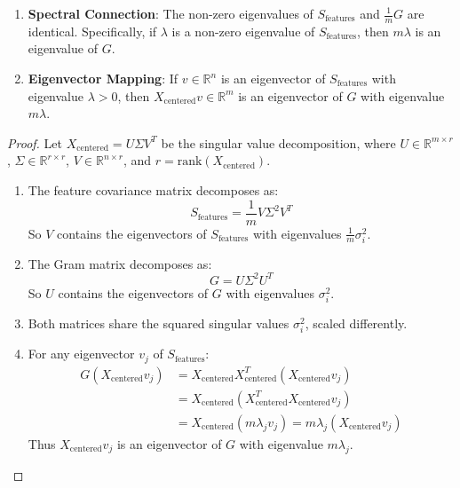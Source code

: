 \begin{notechapter}
\begin{theorem}
\begin{enumerate}
    \item \textbf{Spectral Connection}: The non-zero eigenvalues of $S_{\text{features}}$ and $\frac{1}{m}G$ are identical. Specifically, if $\lambda$ is a non-zero eigenvalue of $S_{\text{features}}$, then $m\lambda$ is an eigenvalue of $G$.

    \item \textbf{Eigenvector Mapping}: If $v \in \mathbb{R}^n$ is an eigenvector of $S_{\text{features}}$ with eigenvalue $\lambda > 0$, then $X_{\text{centered}}v \in \mathbb{R}^m$ is an eigenvector of $G$ with eigenvalue $m\lambda$.
\end{enumerate}
\end{theorem}

\begin{proof}
Let $X_{\text{centered}} = U\Sigma V^T$ be the singular value decomposition, where $U \in \mathbb{R}^{m \times r}$, $\Sigma \in \mathbb{R}^{r \times r}$, $V \in \mathbb{R}^{n \times r}$, and $r = \text{rank}(X_{\text{centered}})$.

\begin{enumerate}
    \item The feature covariance matrix decomposes as:
    \[
    S_{\text{features}} = \frac{1}{m}V\Sigma^2 V^T
    \]
    So $V$ contains the eigenvectors of $S_{\text{features}}$ with eigenvalues $\frac{1}{m}\sigma_i^2$.

    \item The Gram matrix decomposes as:
    \[
    G = U\Sigma^2 U^T
    \]
    So $U$ contains the eigenvectors of $G$ with eigenvalues $\sigma_i^2$.

    \item Both matrices share the squared singular values $\sigma_i^2$, scaled differently.

    \item For any eigenvector $v_j$ of $S_{\text{features}}$:
    \begin{align*}
    G(X_{\text{centered}}v_j) &= X_{\text{centered}}X_{\text{centered}}^T(X_{\text{centered}}v_j) \\
    &= X_{\text{centered}}(X_{\text{centered}}^T X_{\text{centered}}v_j) \\
    &= X_{\text{centered}}(m\lambda_j v_j) = m\lambda_j (X_{\text{centered}}v_j)
    \end{align*}
    Thus $X_{\text{centered}}v_j$ is an eigenvector of $G$ with eigenvalue $m\lambda_j$.
\end{enumerate}
\end{proof}


\end{notechapter}
